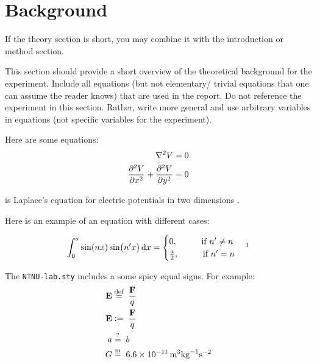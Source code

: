 \section{Background}


If the theory section is short, you may combine it with the introduction or method section. \par

This section should provide a short overview of the theoretical background for the experiment. Include all equations (but not elementary/ trivial equations that one can assume the reader knows) that are used in the report. Do not reference the experiment in this section. Rather, write more general and use arbitrary variables in equations (not specific variables for the experiment). \par

Here are some equations:
\begin{align} %
    \laplacian{V} &=0 \nonumber \\
    \frac{\partial^2 V}{\partial x^2}+\dpd[2]{V}{y} &=0 \label{eq:Laplace} %
\end{align}

is Laplace's equation for electric potentials in two dimensions \parencite[131,136]{Griffiths}. \par
Here is an example of an equation with different cases:

\begin{align*} %
    \int_{0}^{a}\sin(nx)\sin(n'x) \dd x = 
    \begin{cases} 
        0, \hspace{1cm} \text{if } n'\neq n \\ 
        \frac{a}{2}, \hspace{1cm} \text{if } n'= n
    \end{cases}
    \footnotemark{}
\end{align*}

The \verb+NTNU-lab.sty+ includes a some spicy equal signs. For example: 
\begin{align}
    \vb{E} & \defeq \frac{\vb{F}}{q} \label{eq:def} \\
    \vb{E} &\coleq\frac{\vb{F}}{q} \label{eq:col} \\
    a      &\qmeq b                 \label{eq:qm}  \\
    G      &\meq \SI{6.6e-11}{m^3 kg^{-1} s^{-2}}  \label{eq:m} 
\end{align}


